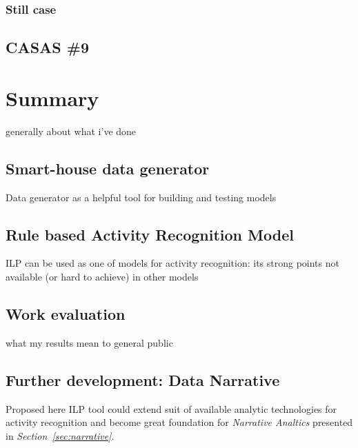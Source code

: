 \documentclass[12pt, a4paper, pdflatex, leqno, twoside, openright]{report}
\begin{document}
    \subsection{Still case}

  \section{CASAS \#9}


\chapter{Summary\label{ch:summary}}
generally about what i've done

  \section{Smart-house data generator}
Data generator as a helpful tool for building and testing models\\

  \section{Rule based Activity Recognition Model}
ILP can be used as one of models for activity recognition: its strong points not available (or hard to achieve) in other models

  \section{Work evaluation}
what my results mean to general public

  \section{Further development: Data Narrative\label{sec:narrative}}

Proposed here ILP tool could extend suit of available analytic technologies for activity recognition and become great foundation for \emph{Narrative Analtics} presented in \emph{Section~\ref{sec:narrative}}.
\end{document}
